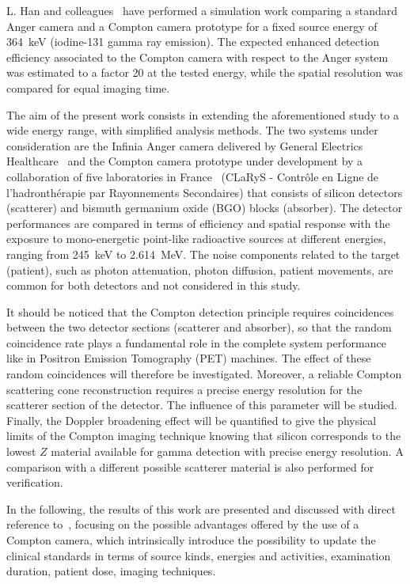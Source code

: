L. Han and colleagues~\cite{HanComp} have performed a simulation work comparing a standard Anger camera and a Compton camera prototype for a fixed source energy of 364~keV (iodine-131 gamma ray emission). The expected enhanced detection efficiency associated to the Compton camera with respect to the Anger system was estimated to a factor 20 at the tested energy, while the spatial resolution was compared for equal imaging time. 

The aim of the present work consists in extending the aforementioned study to a wide energy range, with simplified analysis methods. The two systems under consideration are the Infinia Anger camera delivered by General Electrics Healthcare~\cite{AC_datasheet} and the Compton camera prototype under development by a collaboration of five laboratories in France~\cite{Krimmer2015} (CLaRyS - Contr\^{o}le en Ligne de l'hadronth\'{e}rapie par Rayonnements Secondaires) that consists of silicon detectors (scatterer) and bismuth germanium oxide (BGO) blocks (absorber). The detector performances are compared in terms of efficiency and spatial response with the exposure to mono-energetic point-like radioactive sources at different energies, ranging from 245~keV to 2.614~MeV. The noise components related to the target (patient), such as photon attenuation, photon diffusion, patient movements, are common for both detectors and not considered in this study.

It should be noticed that the Compton detection principle requires coincidences between the two detector sections (scatterer and absorber), so that the random coincidence rate plays a fundamental role in the complete system performance like in Positron Emission Tomography (PET) machines. The effect of these random coincidences will therefore be investigated. Moreover, a reliable Compton scattering cone reconstruction requires a precise energy resolution for the scatterer section of the detector. The influence of this parameter will be studied. Finally, the Doppler broadening effect will be quantified to give the physical limits of the Compton imaging technique knowing that silicon corresponds to the lowest $Z$ material available for gamma detection with precise energy resolution. A comparison with a different possible scatterer material is also performed for verification.

In the following, the results of this work are presented and discussed with direct reference to~\cite{HanComp}, focusing on the possible advantages offered by the use of a Compton camera, which intrinsically introduce the possibility to update the clinical standards in terms of source kinds, energies and activities, examination duration, patient dose, imaging techniques.


